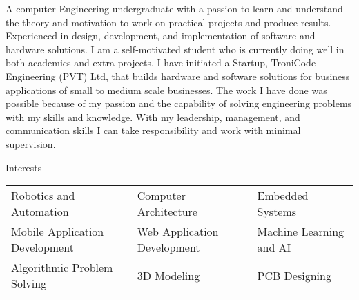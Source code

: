 \documentclass{resume} %
\begin{document}

\begin{rSection}{}
\begin{rSubsection}{}{}{}{}
A computer Engineering undergraduate with a passion to learn and understand the theory and motivation to work on practical projects and produce results.  Experienced in design, development, and implementation of software and hardware solutions.  I am a self-motivated student who is currently doing well in both academics and extra projects. I have initiated a Startup, TroniCode Engineering (PVT) Ltd, that builds hardware and software solutions for business applications of small to medium scale businesses.  The work I have done was possible because of my passion and the capability of solving engineering problems with my skills and knowledge.  With my leadership, management, and communication skills I can take responsibility and work with minimal supervision.

\end{rSubsection}
\end{rSection}



\begin{rSection}{Interests}
\begin{tabular}{l l l} 
Robotics and Automation & Computer Architecture & Embedded Systems \\
Mobile Application Development & Web Application Development & Machine Learning and AI \\
Algorithmic Problem Solving & 3D Modeling & PCB Designing
\end{tabular}


\end{rSection}
\end{document}
